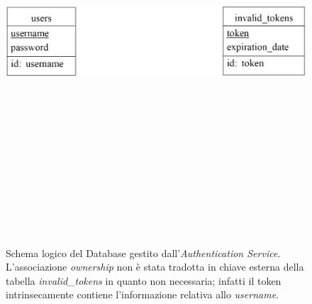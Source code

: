 \begin{figure}
  \centering
  \includegraphics[height=15cm, width=12cm,
		keepaspectratio]{images/AuthenticationServiceDBLogic.PNG}
  \caption{Schema logico del Database gestito dall'\textit{Authentication Service}. L'associazione \textit{ownership} non è stata tradotta in chiave esterna della tabella \textit{invalid\_tokens} in quanto non necessaria; infatti il token intrinsecamente contiene l'informazione relativa allo \textit{username}.}
  \label{fig:authentication-service-logic-schema}
\end{figure}

